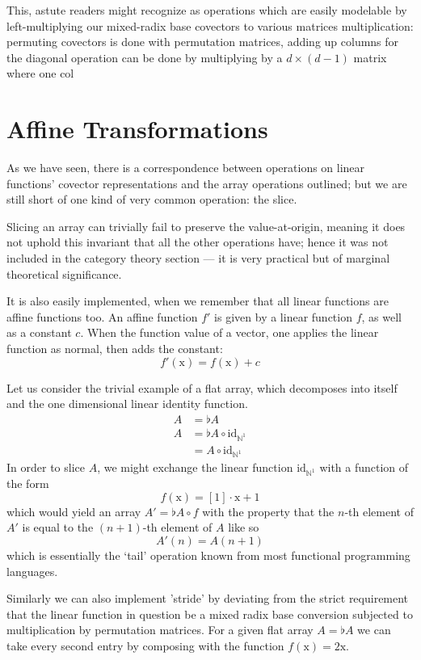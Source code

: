 \documentclass{DIKU-report-variant}
\newcommand\mrm[1]{\mathrm{#1}}
\newcommand\brm[1]{\bm{\mrm{#1}}}
\newcommand\Nat{\mathbb{N}}
\begin{document}
This, astute readers might recognize as operations which are easily modelable by left-multiplying
our mixed-radix base covectors to various matrices
multiplication: permuting covectors is done with permutation matrices, adding up columns
for the diagonal operation can be done by multiplying by a \(d \times (d-1)\) matrix where
one col

\section{Affine Transformations}

As we have seen, there is a correspondence between operations on linear functions' covector representations
and the array operations outlined; but we are still short of one kind of very common operation: the slice.

Slicing an array can trivially fail to preserve the value-at-origin, meaning it does not uphold this invariant
that all the other operations have; hence it was not included in the category theory section --- it is very practical
but of marginal theoretical significance.

It is also easily implemented, when we remember that all linear functions are affine functions too. An affine function \(f'\)
is given by a linear function \(f\), as well as a constant \(c\). When the function value of a vector, one applies
the linear function as normal, then adds the constant:
\[ f'(\brm x) = f(\brm x) + c \]

Let us consider the trivial example of a flat array, which decomposes into itself and the one dimensional linear
identity function.
\begin{align*}
  A &= \flat A \\
  A &= \flat A \circ \mrm{id}_{\Nat^1} \\&= A \circ \mrm{id}_{\Nat^1}
\end{align*}
In order to slice \(A\), we might exchange the linear function \(\mrm{id}_{\Nat^1}\) with a function of the form
\[ f(\brm x) = [1] \cdot \brm x + 1 \]
which would yield an array \(A' = \flat A \circ f\) with the property that the \(n\)-th element of \(A'\) is
equal to the \((n+1)\)-th element of \(A\) like so
\[ A'(n) = A(n+1) \]
which is essentially the `tail' operation known from most functional programming languages.

Similarly we can also implement 'stride' by deviating from the strict requirement that the linear function
in question be a mixed radix base conversion subjected to multiplication by permutation matrices. For a given
flat array \(A = \flat A\) we can take every second entry by composing with the function \(f(\brm x) = 2\brm x\).
\end{document}
